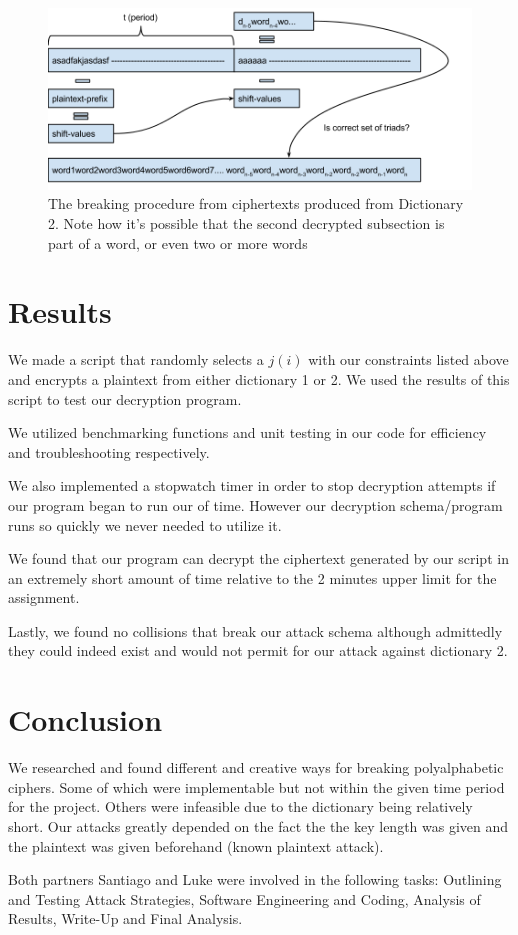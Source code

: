 \documentclass[pdftex,12pt,letter]{article}
\begin{document}
\begin{figure}[ht!]
    \centering
    \includegraphics[width=.8\textwidth]{breaking-dict2}
    \caption{The breaking procedure from ciphertexts produced from Dictionary 2. Note
    how it's possible that the second decrypted subsection is part of a word, or even two or more
words}
    \label{breaking-dict1}
\end{figure}


\section{Results}
We made a script that randomly selects a $j(i)$ with our constraints listed above and 
encrypts a plaintext from either dictionary 1 or 2. We used the results of this script 
to test our decryption program.  

We utilized benchmarking functions and unit testing in our code for efficiency 
and troubleshooting respectively. 

We also implemented a stopwatch timer in order to stop decryption attempts if 
our program began to run our of time. However our decryption schema/program runs 
so quickly we never needed to utilize it. 

We found that our program can decrypt the ciphertext generated by our script in 
an extremely short amount of time relative to the 2 minutes upper limit for the 
assignment. 

Lastly, we found no collisions that break our attack schema although admittedly 
they could indeed exist and would not permit for our attack against dictionary 2. 
 
\section{Conclusion}
We researched and found different and creative ways for breaking polyalphabetic ciphers.
Some of which were implementable but not within the given time period for the project.
Others were infeasible due to the dictionary being relatively short. Our attacks 
greatly depended on the fact the the key length was given and the plaintext was
given beforehand (known plaintext attack).

Both partners Santiago and Luke were involved in the following tasks: 
Outlining and Testing  Attack Strategies, Software Engineering and Coding, Analysis of Results, 
Write-Up and Final Analysis.
\end{document}
